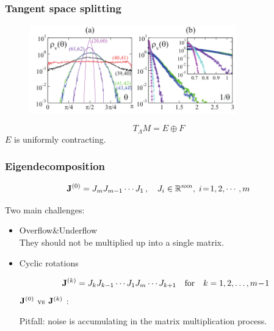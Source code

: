 \documentclass[mathserif, handout]{beamer}
\begin{document}
\begin{frame}
  \frametitle{Tangent space splitting~{\color{yellow}\cite{TaGiCh11}}}
  \begin{figure}[h]
    \centering
    \includegraphics[width=0.8\textwidth]{kaza2011} %
  \end{figure}
  \[
  T_\Lambda M = E \oplus F
  \]
  \centering $E$ is {\color{green} uniformly contracting}.

\end{frame}

\begin{frame}
  \frametitle{Eigendecomposition}
  \begin{equation}
    \mathbf{J}^{(0)}=J_{m}J_{m-1}\cdots J_{1}\,,\quad
    J_{i}\in \mathbb{R}^{n\!\times\! n},\; i\!=\!1,2,\cdots,m
    \label{eq:problem}
  \end{equation}

  \pause 

  Two main challenges:
  \begin{itemize}
  \item
    {\color{green} Overflow\quad\&\quad Underflow} \\

    They should not be multiplied up into a single matrix.

    \vspace{1em}
    \pause

  \item
    {\color{green} Cyclic rotations}

    \[
    \mathbf{J}^{(k)}=J_{k}J_{k-1}\cdots J_{1}J_{m}\cdots
    J_{k+1} \quad \text{for}\quad k=1,2,\dots,m\!-\!1
    \]
    $\mathbf{J}^{(0)}$ vs $\mathbf{J}^{(k)}$ :

    \vspace{1em}
    \pause

    {\color{red} Pitfall}:
    noise is accumulating in the matrix multiplication process.

  \end{itemize}


\end{frame}
\end{document}

